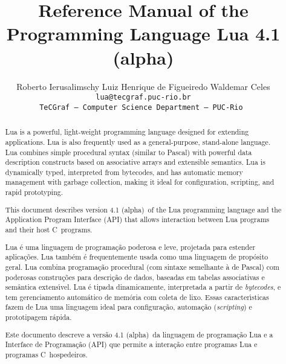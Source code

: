 \documentclass[11pt,twoside,draft]{article}
\def\tecgraf{{\sf TeCGraf}}
\newcommand{\Version}{4.1 (alpha)}
\begin{document}
\title{\Large\bf Reference Manual of the Programming Language Lua \Version}

\author{%
Roberto Ierusalimschy\qquad
Luiz Henrique de Figueiredo\qquad
Waldemar Celes
\vspace{1.0ex}\\
\smallskip
\small\tt lua@tecgraf.puc-rio.br
\vspace{2.0ex}\\
\tecgraf\ --- Computer Science Department --- PUC-Rio
}


\maketitle

\pagestyle{plain}

\begin{abstract}
\noindent
Lua is a powerful, light-weight programming language
designed for extending applications.
Lua is also frequently used as a general-purpose, stand-alone language.
Lua combines simple procedural syntax
(similar to Pascal)
with
powerful data description constructs
based on associative arrays and extensible semantics.
Lua is
dynamically typed,
interpreted from bytecodes,
and has automatic memory management with garbage collection,
making it ideal for
configuration,
scripting,
and
rapid prototyping.

This document describes version \Version\ of the Lua programming language
and the Application Program Interface (API)
that allows interaction between Lua programs and their host C~programs.
\end{abstract}

\def\abstractname{Resumo}
\begin{abstract}
\noindent
Lua \'e uma linguagem de programa\c{c}\~ao
poderosa e leve,
projetada para estender aplica\c{c}\~oes.
Lua tamb\'em \'e frequentemente usada como uma linguagem de prop\'osito geral.
Lua combina programa\c{c}\~ao procedural
(com sintaxe semelhante \`a de Pascal)
com
poderosas constru\c{c}\~oes para descri\c{c}\~ao de dados,
baseadas em tabelas associativas e sem\^antica extens\'\i vel.
Lua \'e
tipada dinamicamente,
interpretada a partir de \emph{bytecodes},
e tem gerenciamento autom\'atico de mem\'oria com coleta de lixo.
Essas caracter\'{\i}sticas fazem de Lua uma linguagem ideal para
configura\c{c}\~ao,
automa\c{c}\~ao (\emph{scripting})
e prototipagem r\'apida.

Este documento descreve a vers\~ao \Version\ da linguagem de
programa\c{c}\~ao Lua e a Interface de Programa\c{c}\~ao (API) que permite
a intera\c{c}\~ao entre programas Lua e programas C~hospedeiros.
\end{abstract}
\end{document}
